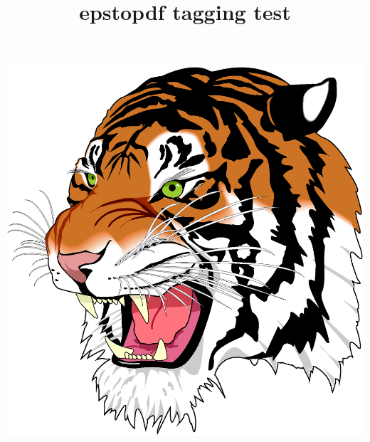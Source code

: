 \documentclass{article}
\title{epstopdf tagging test}
\begin{document}
\includegraphics[alt=alt text,scale=0.5]{tiger.eps}
\end{document}
